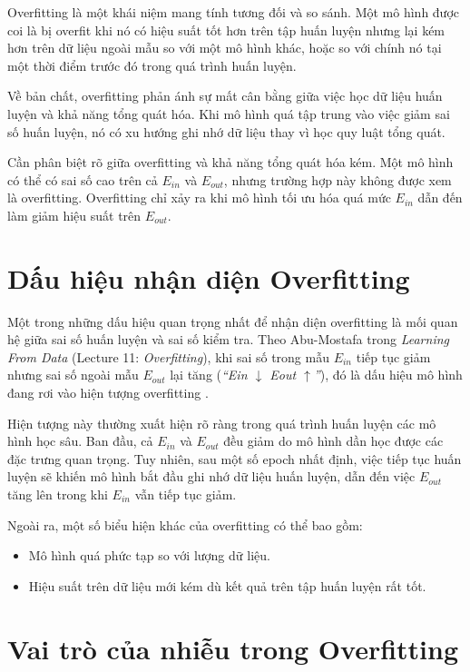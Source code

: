 Overfitting là một khái niệm mang tính tương đối và so sánh. Một mô hình được coi là bị overfit khi nó có hiệu suất tốt hơn trên tập huấn luyện nhưng lại kém hơn trên dữ liệu ngoài mẫu so với một mô hình khác, hoặc so với chính nó tại một thời điểm trước đó trong quá trình huấn luyện.

Về bản chất, overfitting phản ánh sự mất cân bằng giữa việc học dữ liệu huấn luyện và khả năng tổng quát hóa. Khi mô hình quá tập trung vào việc giảm sai số huấn luyện, nó có xu hướng ghi nhớ dữ liệu thay vì học quy luật tổng quát.

Cần phân biệt rõ giữa overfitting và khả năng tổng quát hóa kém. Một mô hình có thể có sai số cao trên cả $E_{in}$ và $E_{out}$, nhưng trường hợp này không được xem là overfitting. Overfitting chỉ xảy ra khi mô hình tối ưu hóa quá mức $E_{in}$ dẫn đến làm giảm hiệu suất trên $E_{out}$.

\section{Dấu hiệu nhận diện Overfitting}

Một trong những dấu hiệu quan trọng nhất để nhận diện overfitting là mối quan hệ giữa sai số huấn luyện và sai số kiểm tra. Theo Abu-Mostafa trong \textit{Learning From Data} (Lecture 11: \textit{Overfitting}), khi sai số trong mẫu \(E_{in}\) tiếp tục giảm nhưng sai số ngoài mẫu \(E_{out}\) lại tăng (\textit{``Ein $\downarrow$ Eout $\uparrow$''}), đó là dấu hiệu mô hình đang rơi vào hiện tượng overfitting \cite{caltech_lfd}.

Hiện tượng này thường xuất hiện rõ ràng trong quá trình huấn luyện các mô hình học sâu. Ban đầu, cả $E_{in}$ và $E_{out}$ đều giảm do mô hình dần học được các đặc trưng quan trọng. Tuy nhiên, sau một số epoch nhất định, việc tiếp tục huấn luyện sẽ khiến mô hình bắt đầu ghi nhớ dữ liệu huấn luyện, dẫn đến việc $E_{out}$ tăng lên trong khi $E_{in}$ vẫn tiếp tục giảm.

Ngoài ra, một số biểu hiện khác của overfitting có thể bao gồm:
\begin{itemize}
    \item Mô hình quá phức tạp so với lượng dữ liệu.
    \item Hiệu suất trên dữ liệu mới kém dù kết quả trên tập huấn luyện rất tốt.
\end{itemize}

\section{Vai trò của nhiễu trong Overfitting}

